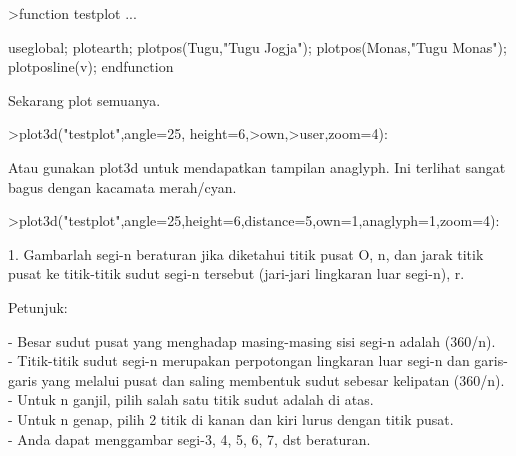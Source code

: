 \documentclass[12pt,arial,letterpaper]{book}
\begin{document}
\begin{eulernootebook}
\begin{eulercomment}
\begin{eulercomment}
\begin{eulernootebook}
\begin{eulercomment}
\begin{eulercomment}
\begin{eulercomment}
\begin{eulercomment}
\begin{eulercomment}
\begin{eulercomment}
\begin{eulernotebook}
\begin{eulercomment}
\begin{eulercomment}
\begin{eulercomment}
\begin{eulercomment}
\begin{eulercomment}
\begin{eulercomment}
\begin{eulerprompt}
>function testplot ...
\end{eulerprompt}
\begin{eulerudf}
  useglobal;
  plotearth;
  plotpos(Tugu,"Tugu Jogja"); plotpos(Monas,"Tugu Monas");
  plotposline(v);
  endfunction
\end{eulerudf}
\begin{eulercomment}
Sekarang plot semuanya.
\end{eulercomment}
\begin{eulerprompt}
>plot3d("testplot",angle=25, height=6,>own,>user,zoom=4):
\end{eulerprompt}
\begin{eulercomment}
Atau gunakan plot3d untuk mendapatkan tampilan anaglyph. Ini terlihat
sangat bagus dengan kacamata merah/cyan.
\end{eulercomment}
\begin{eulerprompt}
>plot3d("testplot",angle=25,height=6,distance=5,own=1,anaglyph=1,zoom=4):
\end{eulerprompt}
\begin{eulercomment}
1. Gambarlah segi-n beraturan jika diketahui titik pusat O, n, dan
jarak titik pusat ke titik-titik sudut segi-n tersebut (jari-jari
lingkaran luar segi-n), r.

Petunjuk:

- Besar sudut pusat yang menghadap masing-masing sisi segi-n adalah
(360/n).\\
- Titik-titik sudut segi-n merupakan perpotongan lingkaran luar segi-n
dan garis-garis yang melalui pusat dan saling membentuk sudut sebesar
kelipatan (360/n).\\
- Untuk n ganjil, pilih salah satu titik sudut adalah di atas.\\
- Untuk n genap, pilih 2 titik di kanan dan kiri lurus dengan titik
pusat.\\
- Anda dapat menggambar segi-3, 4, 5, 6, 7, dst beraturan.


\end{eulercomment}
\end{eulercomment}
\end{eulercomment}
\end{eulercomment}
\end{eulercomment}
\end{eulercomment}
\end{eulercomment}
\end{eulernotebook}
\end{eulercomment}
\end{eulercomment}
\end{eulercomment}
\end{eulercomment}
\end{eulercomment}
\end{eulercomment}
\end{eulernootebook}
\end{eulercomment}
\end{eulercomment}
\end{eulernootebook}
\end{document}
